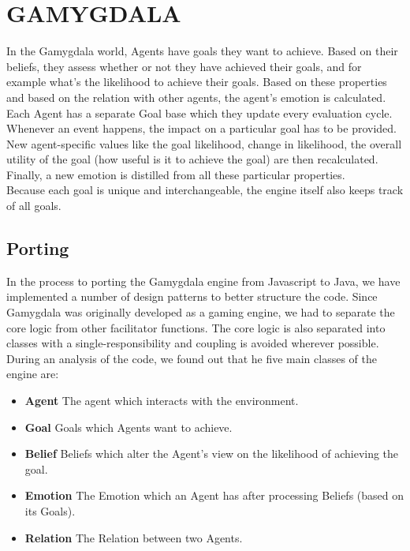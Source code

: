 \section{GAMYGDALA}
In the Gamygdala world, Agents have goals they want to achieve. Based on their beliefs, they assess whether or not they have achieved their goals, and for example what's the likelihood to achieve their goals. Based on these properties and based on the relation with other agents, the agent's emotion is calculated. \\ 

Each Agent has a separate Goal base which they update every evaluation cycle. Whenever an event happens, the impact on a particular goal has to be provided. New agent-specific values like the goal likelihood, change in likelihood, the overall utility of the goal (how useful is it to achieve the goal) are then recalculated. Finally, a new emotion is distilled from all these particular properties. \\

Because each goal is unique and interchangeable, the engine itself also keeps track of all goals. \\

\subsection{Porting}
In the process to porting the Gamygdala engine from Javascript to Java, we have implemented a number of design patterns to better structure the code. Since Gamygdala was originally developed as a gaming engine, we had to separate the core logic from other facilitator functions. The core logic is also separated into classes with a single-responsibility and coupling is avoided wherever possible. \\

During an analysis of the code, we found out that he five main classes of the engine are:
\begin{itemize}
	\item \textbf{Agent} The agent which interacts with the environment.
	\item \textbf{Goal} Goals which Agents want to achieve.
	\item \textbf{Belief} Beliefs which alter the Agent's view on the likelihood of achieving the goal.
	\item \textbf{Emotion} The Emotion which an Agent has after processing Beliefs (based on its Goals).
	\item \textbf{Relation} The Relation between two Agents.
\end{itemize}

